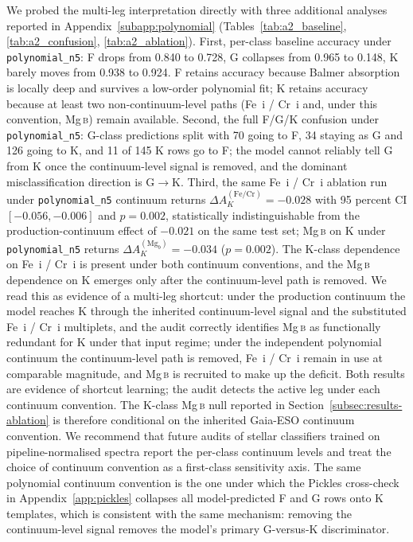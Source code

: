 \documentclass[11pt,a4paper]{article}
\newcommand{\Mgb}{Mg\,\textsc{b}\xspace}
\newcommand{\dA}{\Delta A}
\begin{document}
We probed the multi-leg interpretation directly with three additional analyses reported in Appendix~\ref{subapp:polynomial} (Tables~\ref{tab:a2_baseline}, \ref{tab:a2_confusion}, \ref{tab:a2_ablation}). First, per-class baseline accuracy under \texttt{polynomial\_n5}: F drops from 0.840 to 0.728, G collapses from 0.965 to 0.148, K barely moves from 0.938 to 0.924. F retains accuracy because Balmer absorption is locally deep and survives a low-order polynomial fit; K retains accuracy because at least two non-continuum-level paths (Fe~i / Cr~i and, under this convention, \Mgb) remain available. Second, the full F/G/K confusion under \texttt{polynomial\_n5}: G-class predictions split with 70 going to F, 34 staying as G and 126 going to K, and 11 of 145 K rows go to F; the model cannot reliably tell G from K once the continuum-level signal is removed, and the dominant misclassification direction is G$\to$K. Third, the same Fe~i / Cr~i ablation run under \texttt{polynomial\_n5} continuum returns $\dA_K^{(\mathrm{Fe}/\mathrm{Cr})} = -0.028$ with 95 percent CI $[-0.056, -0.006]$ and $p = 0.002$, statistically indistinguishable from the production-continuum effect of $-0.021$ on the same test set; \Mgb on K under \texttt{polynomial\_n5} returns $\dA_K^{(\mathrm{Mg}_b)} = -0.034$ ($p = 0.002$). The K-class dependence on Fe~i / Cr~i is present under both continuum conventions, and the \Mgb dependence on K emerges only after the continuum-level path is removed. We read this as evidence of a multi-leg shortcut: under the production continuum the model reaches K through the inherited continuum-level signal and the substituted Fe~i / Cr~i multiplets, and the audit correctly identifies \Mgb as functionally redundant for K under that input regime; under the independent polynomial continuum the continuum-level path is removed, Fe~i / Cr~i remain in use at comparable magnitude, and \Mgb is recruited to make up the deficit. Both results are evidence of shortcut learning; the audit detects the active leg under each continuum convention. The K-class \Mgb null reported in Section~\ref{subsec:results-ablation} is therefore conditional on the inherited Gaia-ESO continuum convention. We recommend that future audits of stellar classifiers trained on pipeline-normalised spectra report the per-class continuum levels and treat the choice of continuum convention as a first-class sensitivity axis. The same polynomial continuum convention is the one under which the Pickles cross-check in Appendix~\ref{app:pickles} collapses all model-predicted F and G rows onto K templates, which is consistent with the same mechanism: removing the continuum-level signal removes the model's primary G-versus-K discriminator.
\end{document}
